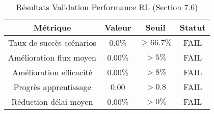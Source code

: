 \begin{table}[h]
\centering
\caption{R\'esultats Validation Performance RL (Section 7.6)}
\begin{tabular}{|c|c|c|c|}
\hline
M\'etrique & Valeur & Seuil & Statut \\
\hline
Taux de succ\`es sc\'enarios & 0.0\% & $\geq 66.7\%$ & FAIL \\
Am\'elioration flux moyen & 0.00\% & $> 5\%$ & FAIL \\
Am\'elioration efficacit\'e & 0.00\% & $> 8\%$ & FAIL \\
Progr\`es apprentissage & 0.00 & $> 0.8$ & FAIL \\
R\'eduction d\'elai moyen & 0.00\% & $> 0\%$ & FAIL \\
\hline
\end{tabular}
\end{table}
